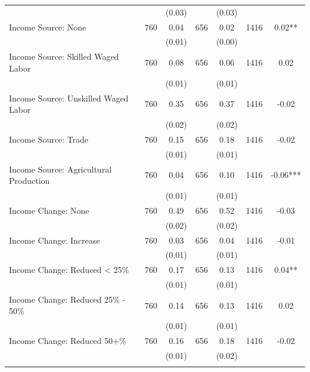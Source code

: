 \begin{tabular}{@{\extracolsep{5pt}}lcccccc}
 &   & (0.03)  &   & (0.03)  &   &  \\ [1ex]
Income Source: None   & 760    & 0.04    & 656    & 0.02    & 1416    & 0.02**   \\
 &   & (0.01)  &   & (0.00)  &   &  \\ [1ex]
Income Source: Skilled Waged Labor   & 760    & 0.08    & 656    & 0.06    & 1416    & 0.02   \\
 &   & (0.01)  &   & (0.01)  &   &  \\ [1ex]
Income Source: Unskilled Waged Labor   & 760    & 0.35    & 656    & 0.37    & 1416    & -0.02   \\
 &   & (0.02)  &   & (0.02)  &   &  \\ [1ex]
Income Source: Trade   & 760    & 0.15    & 656    & 0.18    & 1416    & -0.02   \\
 &   & (0.01)  &   & (0.01)  &   &  \\ [1ex]
Income Source: Agricultural Production   & 760    & 0.04    & 656    & 0.10    & 1416    & -0.06***   \\
 &   & (0.01)  &   & (0.01)  &   &  \\ [1ex]
Income Change: None   & 760    & 0.49    & 656    & 0.52    & 1416    & -0.03   \\
 &   & (0.02)  &   & (0.02)  &   &  \\ [1ex]
Income Change: Increase   & 760    & 0.03    & 656    & 0.04    & 1416    & -0.01   \\
 &   & (0.01)  &   & (0.01)  &   &  \\ [1ex]
Income Change: Reduced < 25\%   & 760    & 0.17    & 656    & 0.13    & 1416    & 0.04**   \\
 &   & (0.01)  &   & (0.01)  &   &  \\ [1ex]
Income Change: Reduced 25\% - 50\%   & 760    & 0.14    & 656    & 0.13    & 1416    & 0.02   \\
 &   & (0.01)  &   & (0.01)  &   &  \\ [1ex]
Income Change: Reduced 50+\%   & 760    & 0.16    & 656    & 0.18    & 1416    & -0.02   \\
 &   & (0.01)  &   & (0.02)  &   &  \\ [1ex]
\hline \hline \\[-1.8ex]

\end{tabular}

